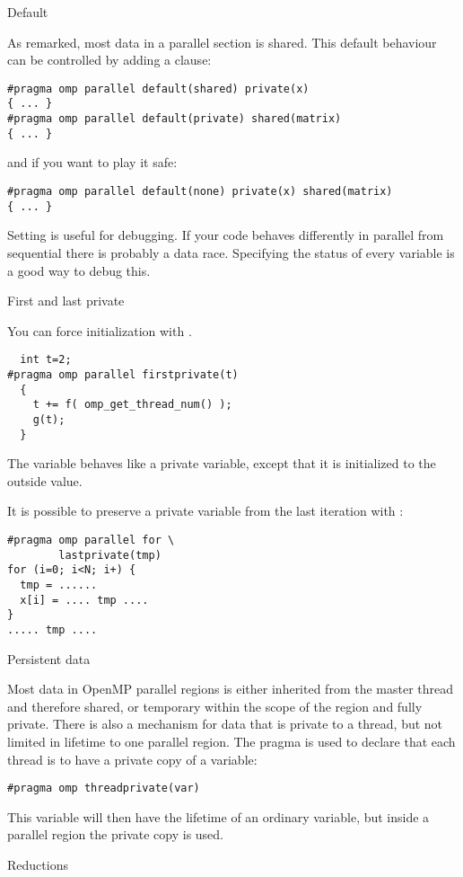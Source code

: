  {Default}

As remarked, most data in a parallel section is shared. This default behaviour can be 
controlled by adding a  clause:
\begin{verbatim}
#pragma omp parallel default(shared) private(x)
{ ... }
#pragma omp parallel default(private) shared(matrix)
{ ... }
\end{verbatim}
and if you want to play it safe:
\begin{verbatim}
#pragma omp parallel default(none) private(x) shared(matrix)
{ ... }
\end{verbatim}

Setting  is useful for debugging. If your code
behaves differently in parallel from sequential there is probably a data race.
Specifying the status of every variable is a good way to
debug this.

 {First and last private}

You can force initialization with .
\begin{verbatim}
  int t=2;
#pragma omp parallel firstprivate(t)
  {
    t += f( omp_get_thread_num() );
    g(t);
  }
\end{verbatim}
The variable  behaves like a private variable, except that it is
initialized to the outside value.

It is possible to preserve a private variable
from the last iteration with :
\begin{verbatim}
#pragma omp parallel for \
        lastprivate(tmp)
for (i=0; i<N; i+) {
  tmp = ......
  x[i] = .... tmp ....
}
..... tmp ....
\end{verbatim}

 {Persistent data}

Most data in OpenMP parallel regions is either inherited
from the master thread and therefore shared, or temporary within the scope of the
region and fully private.
There is also a mechanism for data that is private to a thread, but not limited
in lifetime to one parallel region.
The  pragma is used to declare that each thread
is to have a private copy of a variable:
\begin{verbatim}
#pragma omp threadprivate(var)
\end{verbatim}
This variable will then have the lifetime of an ordinary variable,
but inside a parallel region the private copy is used.

 {Reductions}

